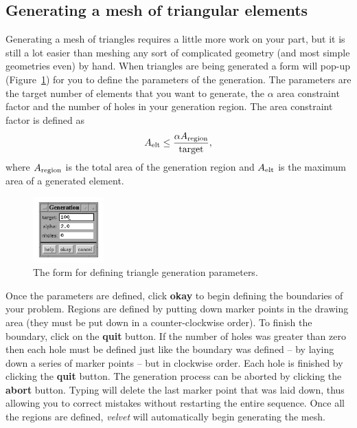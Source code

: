 \subsection{Generating a mesh of triangular elements}

Generating a mesh of triangles requires a little more work on your part,
but it is still a lot easier than meshing any sort of complicated
geometry (and most simple geometries even) by hand.  When triangles are
being generated a form will pop-up (Figure~\ref{velvet.trimesh}) for you
to define the parameters of the generation.  The parameters are
the target number of elements that you want to generate, the $\alpha$
area constraint factor and the number of holes in your generation region.
The area constraint factor is defined as
\begin{equation}
A_{\rm elt} \leq {\alpha A_{\rm region} \over {\rm target}},
\end{equation}
where $A_{\rm region}$ is the total area of the generation region and
$A_{\rm elt}$ is the maximum area of a generated element.
%
\begin{figure}
\begin{center}
 \includegraphics[width=1.07in]{figures/velvet_trimesh}
\end{center}
\caption{The form for defining triangle generation parameters.}
\label{velvet.trimesh}
\end{figure}

Once the parameters are defined, click {\bf okay} to begin defining the 
boundaries of your problem.   Regions are defined by 
putting down marker points in the drawing area (they must be put down in a 
counter-clockwise order).  To finish the boundary, click on the {\bf quit}
button.  If the number of holes was greater than zero then each hole must be 
defined just like the boundary was defined -- by laying down a series of 
marker points -- but in clockwise order.  Each hole is finished by clicking 
the {\bf quit} button. The generation process can be aborted by clicking the 
{\bf abort} button. Typing  will delete the last marker point 
that was laid down, thus allowing you to correct mistakes without restarting 
the entire sequence.  Once all the regions are defined, {\em velvet} will 
automatically begin generating the mesh.  

